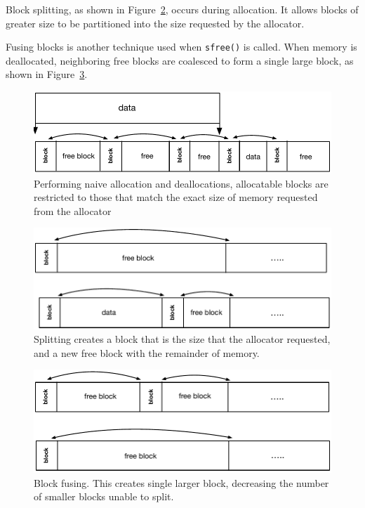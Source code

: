 Block splitting, as shown in Figure~\ref{fig:split}, occurs during allocation. It allows blocks of greater size to be partitioned into the size requested by the allocator. 

Fusing blocks is another technique used when \texttt{sfree()} is called. When memory is deallocated, neighboring free blocks are coalesced to form a single large block, as shown in Figure~\ref{fig:fuse}. 

\begin{figure}[!htb]
\centering
\includegraphics[scale=.55]{figs/fragmentation.pdf}
\caption{Performing naive allocation and deallocations, allocatable blocks are restricted to those that match the exact size of memory requested from the allocator}
\label{fig:fragmentation}
\end{figure}

\begin{figure}[!htb]
\centering
\includegraphics[scale=.55]{figs/split.pdf}
\caption{Splitting creates a block that is the size that the allocator requested, and a new free block with the remainder of memory.}
\label{fig:split}
\end{figure}


\begin{figure}[!htb]
\centering
\includegraphics[scale=.55]{figs/fuse.pdf}
\caption{Block fusing. This creates single larger block, decreasing the number of smaller blocks unable to split.}
\label{fig:fuse}
\end{figure}

%
%
